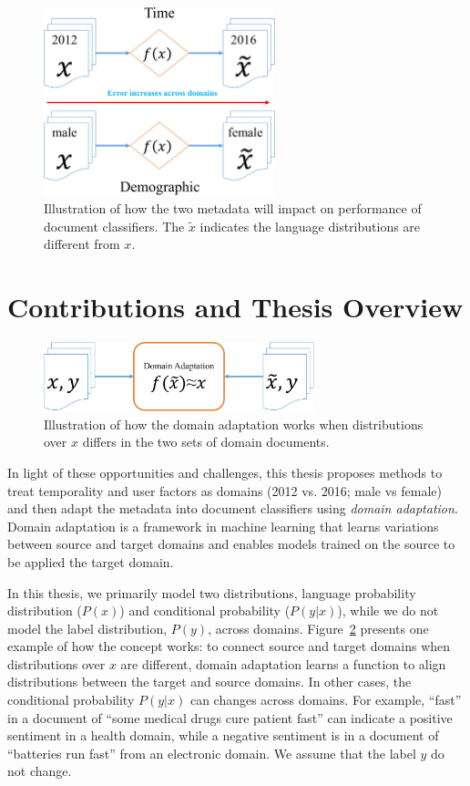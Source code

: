 \begin{figure}[htp]
\centering
\includegraphics[width=0.60\textwidth]{images/chapter1/metadata_impact.pdf}
\caption{Illustration of how the two metadata will impact on performance of document classifiers. The $\tilde{x}$ indicates the language distributions are different from $x$.}
\label{chap1:fig:impact}
\end{figure}

\section{Contributions and Thesis Overview}

\begin{figure}[htp]
\centering
\includegraphics[width=0.70\textwidth]{images/chapter1/da_illu.pdf}
\caption{Illustration of how the domain adaptation works when distributions over $x$ differs in the two sets of domain documents.}
\label{chap1:fig:da}
\end{figure}


In light of these opportunities and challenges, this thesis proposes methods to treat temporality and user factors as domains (2012 vs. 2016; male vs female) and then adapt the metadata into document classifiers using \textit{domain adaptation}.
Domain adaptation is a framework in machine learning that learns variations between source and target domains and enables models trained on the source to be applied the target domain. 


In this thesis, we primarily model two distributions, language probability distribution ($P(x)$) and conditional probability ($P(y|x)$), while we do not model the label distribution, $P(y)$, across domains. Figure~\ref{chap1:fig:da} presents one example of how the concept works: to connect source and target domains when distributions over $x$ are different, domain adaptation learns a function to align distributions between the target and source domains.
In other cases, the conditional probability $P(y|x)$ can changes across domains.
For example, ``fast'' in a document of ``some medical drugs cure patient fast'' can indicate a positive sentiment in a health domain, while a negative sentiment is in a document of ``batteries run fast'' from an electronic domain.
We assume that the label $y$ do not change.

